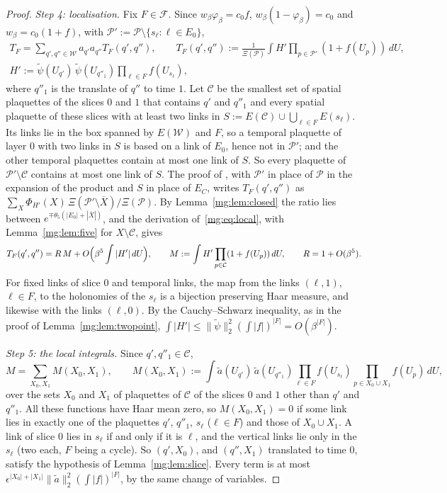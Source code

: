 \documentclass[11pt,a4paper]{article}
\theoremstyle{definition}
\theoremstyle{remark}
\newcommand{\cP}{\mathcal{P}}
\newcommand{\dU}{\,dU}
\newcommand{\norm}[1]{\lVert #1\rVert}
\newcommand{\IIIref}[3]{\cite[#1~`#2' (\texttt{#3})]{III}}
\begin{document}
\begin{proof}
\emph{Step 4: localisation.} Fix $F\in\mathcal F$. Since $w_\beta\varphi_\beta=c_0f$, $w_\beta(1-\varphi_\beta)=c_0$ and $w_\beta=c_0(1+f)$, with
$\cP':=\cP\setminus\{s_\ell:\ell\in E_0\}$,
\begin{gather*}
T_F=\sum_{q',q''\in\mathcal W}a_{q'}a_{q''}T_F(q',q''),\qquad T_F(q',q''):=\frac1{\Xi(\cP)}\int H'\prod_{p\in\cP'}(1+f(U_p))\dU,\\
H':=\tilde\psi(U_{q'})\,\tilde\psi(U_{q''_1})\prod_{\ell\in F}f(U_{s_\ell}),
\end{gather*}
where $q''_1$ is the translate of $q''$ to time $1$. Let $\mathcal C$ be the smallest set of spatial plaquettes of the slices $0$ and $1$ that contains $q'$ and
$q''_1$ and every spatial plaquette of these slices with at least two links in $S:=E(\mathcal C)\cup\bigcup_{\ell\in F}E(s_\ell)$. Its links lie in the box
spanned by $E(\mathcal W)$ and $F$, so a temporal plaquette of layer $0$ with two links in $S$ is based on a link of $E_0$, hence not in $\cP'$; and the other
temporal plaquettes contain at most one link of $S$. So every plaquette of $\cP'\setminus\mathcal C$ contains at most one link of $S$. The proof of
\IIIref{Lemma}{Loop expansion}{al:lem:loopexp}, with $\cP'$ in place of $\cP$ in the expansion of the product and $S$ in place of $E_C$, writes $T_F(q',q'')$ as
$\sum_X\Phi_{H'}(X)\,\Xi(\cP'\setminus\overline X)/\Xi(\cP)$. By Lemma~\ref{mg:lem:closed} the ratio lies between $e^{\mp\theta_5(|E_0|+|\overline X|)}$, and the
derivation of~\eqref{mg:eq:local}, with Lemma~\ref{mg:lem:five} for $X\setminus\mathcal C$, gives
\[
T_F(q',q'')=R\,M+O\Bigl(\beta^5\int|H'|\dU\Bigr),\qquad M:=\int H'\prod_{p\in\mathcal C}(1+f(U_p))\dU,\qquad R=1+O(\beta^5).
\]
For fixed links of slice $0$ and temporal links, the map from the links $(\ell,1)$, $\ell\in F$, to the holonomies of the $s_\ell$ is a bijection preserving
Haar measure, and likewise with the links $(\ell,0)$. By the Cauchy--Schwarz inequality, as in the proof of Lemma~\ref{mg:lem:twopoint},
$\int|H'|\le\norm{\tilde\psi}_2^2(\int|f|)^{|F|}=O(\beta^{|F|})$.

\emph{Step 5: the local integrals.} Since $q',q''_1\in\mathcal C$,
\[
M=\sum_{X_0,X_1}M(X_0,X_1),\qquad M(X_0,X_1):=\int\tilde a(U_{q'})\,\tilde a(U_{q''_1})\prod_{\ell\in F}f(U_{s_\ell})\prod_{p\in X_0\cup X_1}f(U_p)\dU,
\]
over the sets $X_0$ and $X_1$ of plaquettes of $\mathcal C$ of the slices $0$ and $1$ other than $q'$ and $q''_1$. All these functions have Haar mean zero, so
$M(X_0,X_1)=0$ if some link lies in exactly one of the plaquettes $q'$, $q''_1$, $s_\ell$ ($\ell\in F$) and those of $X_0\cup X_1$. A link of slice $0$ lies in
$s_\ell$ if and only if it is $\ell$, and the vertical links lie only in the $s_\ell$ (two each, $F$ being a cycle). So $(q',X_0)$, and $(q'',X_1)$ translated to
time $0$, satisfy the hypothesis of Lemma~\ref{mg:lem:slice}. Every term is at most $\epsilon^{|X_0|+|X_1|}\norm{\tilde a}_2^2(\int|f|)^{|F|}$, by the
same change of variables.


\end{proof}
\end{document}
